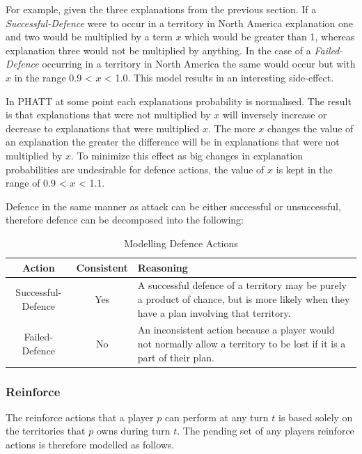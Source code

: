 \documentclass[parskip]{cs4rep}
\begin{document}
For example, given the three explanations from the previous section. If a \textit{Successful-Defence} were to occur in a territory in North America explanation one and two would be multiplied by a term $x$ which would be greater than 1, whereas explanation three would not be multiplied by anything. In the case of a \textit{Failed-Defence} occurring in a territory in North America the same would occur but with $x$ in the range 0.9 < $x$ < 1.0. This model results in an interesting side-effect.

In PHATT at some point each explanations probability is normalised. The result is that explanations that were not multiplied by $x$ will inversely increase or decrease to explanations that were multiplied $x$. The more $x$ changes the value of an explanation the greater the difference will be in explanations that were not multiplied by $x$. To minimize this effect as big changes in explanation probabilities are undesirable for defence actions, the value of $x$ is kept in the range of 0.9 < $x$ < 1.1.

Defence in the same manner as attack can be either successful or unsuccessful, therefore defence can be decomposed into the following: 

\begin{table}[ht]
\centering
\begin{tabular}{|c|c|p{8cm}|}
\hline 
\textbf{Action} & \textbf{Consistent}  & \textbf{Reasoning} \\ 
\hline 
Successful-Defence & Yes & A successful defence of a territory may be purely a product of chance, but is more likely when they have a plan involving that territory. \\ 
\hline 
Failed-Defence & No & An inconsistent action because a player would not normally allow a territory to be lost if it is a part of their plan. \\ 
\hline
\end{tabular}
\caption{Modelling Defence Actions}
\label{table:attack-defend-modelling}
\end{table}

\newpage

\subsubsection{Reinforce}

The reinforce actions that a player $p$ can perform at any turn $t$ is based solely on the territories that $p$ owns during turn $t$. The pending set of any players reinforce actions is therefore modelled as follows. 
\end{document}
